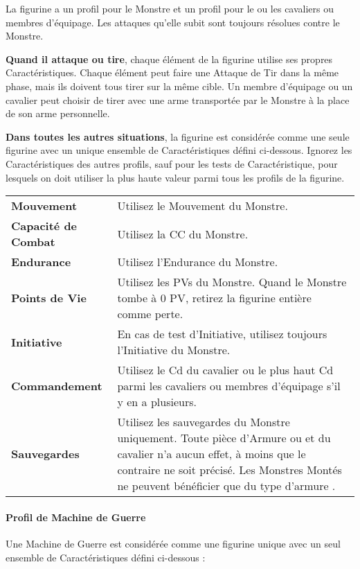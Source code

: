 La figurine a un profil pour le Monstre et un profil pour le ou les cavaliers ou membres d'équipage. Les attaques qu'elle subit sont toujours résolues contre le Monstre.

\textbf{Quand il attaque ou tire}, chaque élément de la figurine utilise ses propres Caractéristiques. Chaque élément peut faire une Attaque de Tir dans la même phase, mais ils doivent tous tirer sur la même cible. Un membre d'équipage ou un cavalier peut choisir de tirer avec une arme transportée par le Monstre à la place de son arme personnelle.

\textbf{Dans toutes les autres situations}, la figurine est considérée comme une seule figurine avec un unique ensemble de Caractéristiques défini ci-dessous. Ignorez les Caractéristiques des autres profils, sauf pour les tests de Caractéristique, pour lesquels on doit utiliser la plus haute valeur parmi tous les profils de la figurine.

\renewcommand{\arraystretch}{2.5}
\begin{center}
\begin{tabular}{>{\bfseries\raggedleft}p{3cm}p{12cm}}
\hline
Mouvement & Utilisez le Mouvement du Monstre. \tabularnewline
Capacité de Combat & Utilisez la CC du Monstre. \tabularnewline
Endurance & Utilisez l'Endurance du Monstre. \tabularnewline
Points de Vie & Utilisez les PVs du Monstre. Quand le Monstre tombe à 0 PV, retirez la figurine entière comme perte. \tabularnewline
Initiative & En cas de test d'Initiative, utilisez toujours l'Initiative du Monstre. \tabularnewline
Commandement & Utilisez le Cd du cavalier ou le plus haut Cd parmi les cavaliers ou membres d'équipage s'il y en a plusieurs. \tabularnewline
Sauvegardes & Utilisez les sauvegardes du Monstre uniquement. Toute pièce d'Armure ou \regeneration{} et \wardsave{} du cavalier n'a aucun effet, à moins que le contraire ne soit précisé. Les Monstres Montés ne peuvent bénéficier que du type d'armure \innatedefence{}. \tabularnewline
\hline
\end{tabular}\end{center}
\renewcommand{\arraystretch}{1.5}

\newpage
\paragraph{Profil de Machine de Guerre}

Une Machine de Guerre est considérée comme une figurine unique avec un seul ensemble de Caractéristiques défini ci-dessous :

